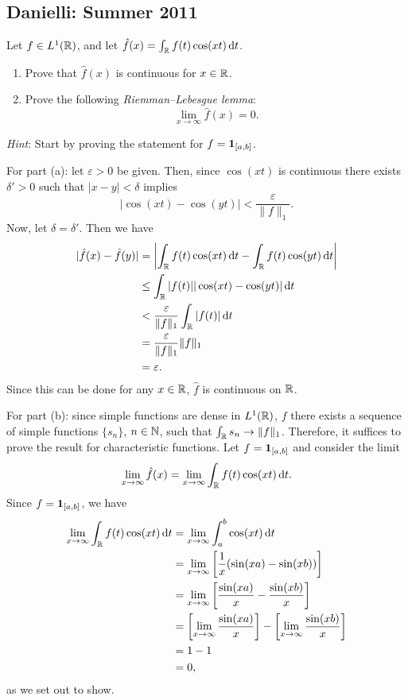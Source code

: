 \subsection{Danielli: Summer 2011}
\setcounter{exercise}{0}
\setcounter{equation}{0}

\begin{problem}
  Let \(f\in L^1(\mathbb{R})\), and let
  \(\hat f(x)=\int_{\mathbb{R}} f(t)\cos(xt)\mathop{}\!\mathrm{d} t\).
  \begin{enumerate}[label=(\alph*)]
  \item Prove that \(\hat f(x)\) is continuous for \(x\in\mathbb{R}\).
  \item Prove the following \emph{Riemman--Lebesgue lemma}:
    \[
      \lim_{x\to\infty}\hat f(x)=0.
    \]
  \end{enumerate}
  \emph{Hint}: Start by proving the statement for \(f=\operatorname{\mathbf{1}}_{[a,b]}\).
\end{problem}
\begin{solution}
  For part (a): let \(\varepsilon>0\) be given. Then, since \(\cos(xt)\) is
  continuous there exists \(\delta'>0\) such that \(|x-y|<\delta\) implies
  \[
    |\cos(xt)-\cos(yt)|<\frac{\varepsilon}{\|f\|_1}.
  \]
  Now, let \(\delta=\delta'\). Then we have
  \begin{align*}
    |\hat f(x)-\hat f(y)|
    &=\left|
      \int_{\mathbb{R}} f(t)\cos(xt)\mathop{}\!\mathrm{d} t
      -\int_{\mathbb{R}} f(t)\cos(yt)\mathop{}\!\mathrm{d} t
      \right|\\
    &\leq\int_{\mathbb{R}}|f(t)||\cos(xt)-\cos(yt)|\mathop{}\!\mathrm{d} t\\
    &<\frac{\varepsilon}{\|f\|_1}\int_{\mathbb{R}}|f(t)|\mathop{}\!\mathrm{d} t\\
    &=\frac{\varepsilon}{\|f\|_1}\|f\|_1\\
    &=\varepsilon.
  \end{align*}
  Since this can be done for any \(x\in\mathbb{R}\), \(\hat f\) is continuous on
  \(\mathbb{R}\).

  For part (b): since simple functions are dense in \(L^1(\mathbb{R})\), \(f\)
  there exists a sequence of simple functions \(\{s_n\}\), \(n\in\mathbb{N}\),
  such that \(\int_{\mathbb{R}} s_n\to\|f\|_1\). Therefore, it suffices to prove
  the result for characteristic functions. Let \(f=\operatorname{\mathbf{1}}_{[a,b]}\) and
  consider the limit
  \[
    \lim_{x\to\infty}\hat f(x)=\lim_{x\to\infty}\int_{\mathbb{R}} f(t)\cos(xt)\mathop{}\!\mathrm{d} t.
  \]
  Since \(f=\operatorname{\mathbf{1}}_{[a,b]}\), we have
  \begin{align*}
    \lim_{x\to\infty}\int_{\mathbb{R}} f(t)\cos(xt)\mathop{}\!\mathrm{d} t
    &=\lim_{x\to\infty}\int_a^b\cos(xt)\mathop{}\!\mathrm{d} t\\
    &=\lim_{x\to\infty}\left[\frac{1}{x}(\sin(xa)-\sin(xb))\right]\\
    &=\lim_{x\to\infty}\left[\frac{\sin(xa)}{x}-\frac{\sin(xb)}{x}\right]\\
    &=\left[\lim_{x\to\infty}\frac{\sin(xa)}{x}\right]
      -\left[\lim_{x\to\infty}\frac{\sin(xb)}{x}\right]\\
    &=1-1\\
    &=0,
  \end{align*}
  as we set out to show.
\end{solution}

